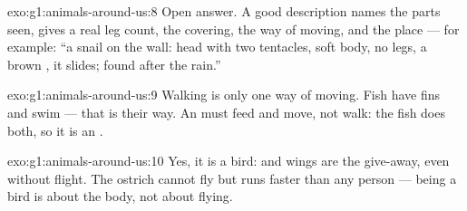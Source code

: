 \begin{solution}{exo:g1:animals-around-us:8}
Open answer. A good description names the parts seen, gives a real
leg count, the covering, the way of moving, and the place --- for
example: ``a snail on the wall: head with two tentacles, soft body,
no legs, a brown , it slides; found after the rain.''
\end{solution}

\begin{solution}{exo:g1:animals-around-us:9}
Walking is only one way of moving. Fish have fins and swim --- that
is their way. An  must feed and move, not walk: the fish does
both, so it is an .
\end{solution}

\begin{solution}{exo:g1:animals-around-us:10}
Yes, it is a bird:  and wings are the give-away, even
without flight. The ostrich cannot fly but runs faster than any
person --- being a bird is about the body, not about flying.
\end{solution}
